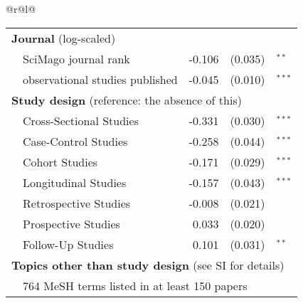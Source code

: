 \begin{tabular}{@{}r@{}l@{}}
\begin{tabular}[t]{@{}ll@{ }r@{ }l@{}l@{}}
\multicolumn{5}{l}{\textbf{Journal} (log-scaled)} \\
& SciMago journal rank & -0.106 & (0.035) & $^{**}$\\ 
& observational studies published & -0.045 & (0.010) & $^{***}$ \\ [.07in]

\multicolumn{5}{l}{\textbf{Study design} (reference: the absence of this)} \\
 & Cross-Sectional Studies & -0.331 & (0.030) & $^{***}$ \\
 & Case-Control Studies & -0.258 & (0.044) & $^{***}$ \\
 & Cohort Studies & -0.171 & (0.029) & $^{***}$ \\
 & Longitudinal Studies & -0.157 & (0.043) & $^{***}$ \\
 & Retrospective Studies & -0.008 & (0.021) & $^{}$ \\
 & Prospective Studies & 0.033 & (0.020) & $^{}$ \\
 & Follow-Up Studies & 0.101 & (0.031) & $^{**}$ \\ 
[.05in]
\multicolumn{5}{l}{\textbf{Topics other than study design} (see SI for details)} \\
& \multicolumn{4}{l}{ 764 MeSH terms listed in at least 150 papers} \\ 
[.03in]

\iffalse
\midrule 
\multicolumn{5}{l}{\textbf{Random Effects}} \\ [.07in]
& Number of sentences in conclusion & \\ 
& Year published & \\ 
& Journal published & \\ 
[.1in]
\fi
\end{tabular} \\





\midrule 
{} \\ [.03in]
\end{tabular}

    
